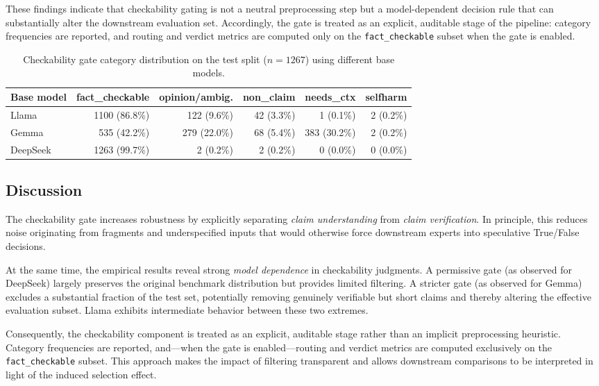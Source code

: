 These findings indicate that checkability gating is not a neutral preprocessing step but a
model-dependent decision rule that can substantially alter the downstream evaluation set.
Accordingly, the gate is treated as an explicit, auditable stage of the pipeline: category
frequencies are reported, and routing and verdict metrics are computed only on the
\texttt{fact\_checkable} subset when the gate is enabled.

\begin{table}[t]
\centering
\caption{Checkability gate category distribution on the test split ($n=1267$) using different base models.}
\label{tab:checkability_dist}
\small
\begin{tabular}{lrrrrr}
\toprule
Base model & fact\_checkable & opinion/ambig. & non\_claim & needs\_ctx & selfharm \\
\midrule
Llama    & 1100 (86.8\%) & 122 (9.6\%)  &  42 (3.3\%) &   1 (0.1\%) & 2 (0.2\%) \\
Gemma    &  535 (42.2\%) & 279 (22.0\%) &  68 (5.4\%) & 383 (30.2\%) & 2 (0.2\%) \\
DeepSeek & 1263 (99.7\%) &   2 (0.2\%)  &   2 (0.2\%) &   0 (0.0\%) & 0 (0.0\%) \\
\bottomrule
\end{tabular}
\normalsize
\end{table}

\subsection{Discussion}

The checkability gate increases robustness by explicitly separating \emph{claim understanding}
from \emph{claim verification}. In principle, this reduces noise originating from fragments and
underspecified inputs that would otherwise force downstream experts into speculative
True/False decisions.

At the same time, the empirical results reveal strong \emph{model dependence} in checkability
judgments. A permissive gate (as observed for DeepSeek) largely preserves the original benchmark
distribution but provides limited filtering. A stricter gate (as observed for Gemma) excludes a
substantial fraction of the test set, potentially removing genuinely verifiable but short claims
and thereby altering the effective evaluation subset. Llama exhibits intermediate behavior
between these two extremes.

Consequently, the checkability component is treated as an explicit, auditable stage rather than
an implicit preprocessing heuristic. Category frequencies are reported, and—when the gate is
enabled—routing and verdict metrics are computed exclusively on the
\texttt{fact\_checkable} subset. This approach makes the impact of filtering transparent and
allows downstream comparisons to be interpreted in light of the induced selection effect.

